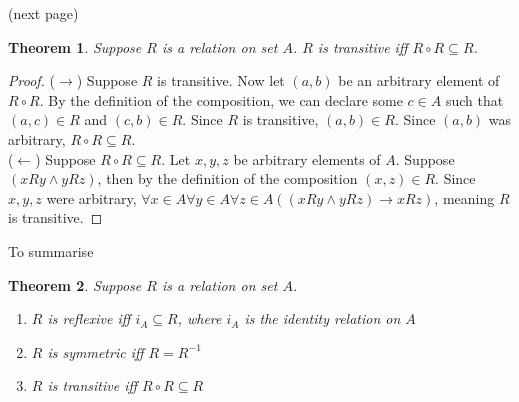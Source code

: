 \documentclass{report}
\newtheorem*{theorem}{Theorem}
\theoremstyle{definition}
\begin{document}
\noindent(next page)\newpage
\begin{theorem}
Suppose $R$ is a relation on set $A$. $R$ is transitive iff $R\circ R\subseteq R$.
\end{theorem}
\begin{proof}
($\rightarrow$) Suppose $R$ is transitive. Now let $(a,b)$ be an arbitrary element of $R\circ R$. By the definition of the composition, we can declare some $c\in A$ such that $(a,c)\in R$ and 
$(c,b)\in R$. Since $R$ is transitive, $(a,b)\in R$. Since $(a,b)$ was arbitrary, $R\circ R\subseteq R$.\\
\indent ($\leftarrow$) Suppose $R\circ R\subseteq R$. Let $x,y,z$ be arbitrary elements of $A$. Suppose $(xRy\land yRz)$, then by the definition of the composition $(x,z)\in R$. Since $x,y,z$ were
arbitrary, $\forall x\in A\forall y\in A\forall z\in A((xRy\land yRz)\to xRz)$, meaning $R$ is transitive.
\end{proof}
\noindent To summarise
\begin{theorem}
Suppose $R$ is a relation on set $A$. 
\begin{enumerate}
\item $R$ is reflexive iff $i_A\subseteq R$, where $i_A$ is the identity relation on $A$
\item $R$ is symmetric iff $R=R^{-1}$
\item $R$ is transitive iff $R\circ R\subseteq R$
\end{enumerate}
\end{theorem}
\newpage
\end{document}
